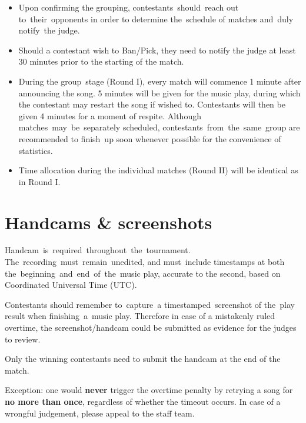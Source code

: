\documentclass{article}
\begin{document}
\begin{itemize}

	\item Upon confirming the grouping,
	      contestants should reach out to their opponents
	      in order to determine the schedule of matches
	      and duly notify the judge.

	\item Should a contestant wish to Ban/Pick,
	      they need to notify the judge at least 30 minutes
	      prior to the starting of the match.

	\item During the group stage (Round I),
	      every match will commence 1 minute
	      after announcing the song.
	      5 minutes will be given for the music play,
	      during which the contestant may restart the song if wished to.
	      Contestants will then be given 4 minutes for
	      a moment of respite.
	      Although matches may be separately scheduled,  %
	      contestants from the same group are recommended
	      to finish up soon whenever possible
	      for the convenience of statistics.  %

	\item Time allocation during the individual matches (Round II) will be identical as in Round I.
\end{itemize}

\section{Handcams \& screenshots}

Handcam is required throughout the tournament.
The recording must remain unedited,
and must include timestamps
at both the beginning and end of the music play,
accurate to the second,
based on Coordinated Universal Time (UTC).

Contestants should remember to capture a timestamped screenshot
of the play result
when finishing a music play.
Therefore in case of a mistakenly ruled overtime,
the screenshot/handcam could be
submitted as evidence for the judges to review.

Only the winning contestants need to submit the handcam
at the end of the match.

Exception: one would \textbf{never}
trigger the overtime penalty
by retrying a song
for \textbf{no more than once},
regardless of whether the timeout occurs.
In case of a wrongful judgement,
please appeal to the staff team.
\end{document}
